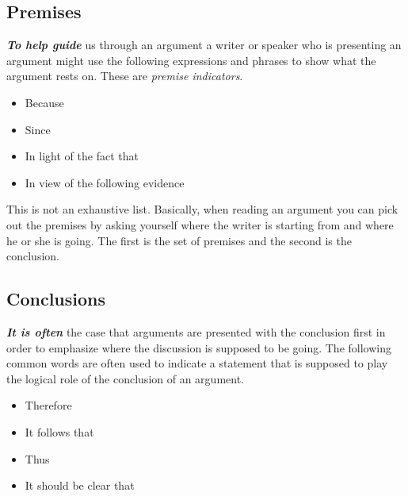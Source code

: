 \documentclass[12pt, openany]{book}
\makeatletter
\providecommand{\tightlist}{%
  \setlength{\itemsep}{0pt}\setlength{\parskip}{0pt}}
\newenvironment{kframe}{%
\medskip{}
\setlength{\fboxsep}{.8em}
 \def\at@end@of@kframe{}%
 \ifinner\ifhmode%
  \def\at@end@of@kframe{\end{minipage}}%
  \begin{minipage}{\columnwidth}%
 \fi\fi%
 \def\FrameCommand##1{\hskip\@totalleftmargin \hskip-\fboxsep
 \colorbox{shadecolor}{##1}\hskip-\fboxsep
     \hskip-\linewidth \hskip-\@totalleftmargin \hskip\columnwidth}%
 \MakeFramed {\advance\hsize-\width
   \@totalleftmargin\z@ \linewidth\hsize
   \@setminipage}}%
 {\par\unskip\endMakeFramed%
 \at@end@of@kframe}
\newenvironment{rmdblock}[1]
  {
  \begin{itemize}
  \renewcommand{\labelitemi}{
    \raisebox{-.7\height}[0pt][0pt]{
      {\setkeys{Gin}{width=3em,keepaspectratio}\texttt{[image: img/\#1]}}
    }
  }
  \setlength{\fboxsep}{1em}
  \begin{kframe}
  \item
  }
  {
  \end{kframe}
  \end{itemize}
  }
\newenvironment{note}
  {\begin{rmdblock}{note}}
  {\end{rmdblock}}
\makeatother
\begin{document}
\hypertarget{premises}{%
\subsection*{Premises}\label{premises}}


\textbf{\emph{To help guide}} us through an argument a writer or speaker who is presenting an argument might use the following expressions and phrases to show what the argument rests on. These are \emph{premise indicators}.

\begin{note}

\begin{itemize}
\tightlist
\item
  Because
\item
  Since
\item
  In light of the fact that
\item
  In view of the following evidence
\end{itemize}

\end{note}

This is not an exhaustive list. Basically, when reading an argument you can pick out the premises by asking yourself where the writer is starting from and where he or she is going. The first is the set of premises and the second is the conclusion.

\hypertarget{conclusions}{%
\subsection*{Conclusions}\label{conclusions}}


\textbf{\emph{It is often}} the case that arguments are presented with the conclusion first in order to emphasize where the discussion is supposed to be going. The following common words are often used to indicate a statement that is supposed to play the logical role of the conclusion of an argument.

\begin{note}

\begin{itemize}
\tightlist
\item
  Therefore
\item
  It follows that
\item
  Thus
\item
  It should be clear that
\end{itemize}

\end{note}
\end{document}
